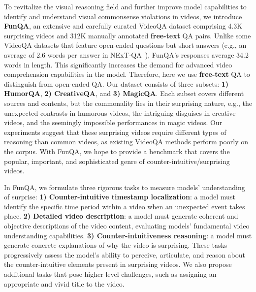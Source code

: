 \noindent To revitalize the visual reasoning field and further improve model capabilities to identify and understand visual commonsense violations in videos, we introduce \textbf{FunQA}, an extensive and carefully curated VideoQA dataset comprising 4.3K surprising videos and 312K manually annotated \textbf{free-text} QA pairs. Unlike some VideoQA datasets that feature open-ended questions but short answers (e.g., an average of 2.6 words per answer in NExT-QA~\cite{xiao2021nextqanext}), FunQA's responses average 34.2 words in length. This significantly increases the demand for advanced video comprehension capabilities in the model. Therefore, here we use \textbf{free-text} QA to distinguish from open-ended QA. Our dataset consists of three subsets: \textbf{1) HumorQA}, \textbf{2) CreativeQA}, and \textbf{3) MagicQA}. Each subset covers different sources and contents, but the commonality lies in their surprising nature, e.g., the unexpected contrasts in humorous videos, the intriguing disguises in creative videos, and the seemingly impossible performances in magic videos. Our experiments suggest that these surprising videos require different types of reasoning than common videos, as existing VideoQA methods perform poorly on the corpus. With FunQA, we hope to provide a benchmark that covers the popular, important, and sophisticated genre of counter-intuitive/surprising videos. 

\noindent In FunQA, we formulate three rigorous tasks to measure models' understanding of surprise:
\textbf{1) Counter-intuitive timestamp localization}: a model must identify the specific time period within a video when an unexpected event takes place.
\textbf{2) Detailed video description}: a model must generate coherent and objective descriptions of the video content, evaluating models' fundamental video understanding capabilities.
\textbf{3) Counter-intuitiveness reasoning}: a model must generate concrete explanations of why the video is surprising. %
These tasks progressively assess the model's ability to perceive, articulate, and reason about the counter-intuitive elements present in surprising videos. We also propose additional tasks that pose higher-level challenges, such as assigning an appropriate and vivid title to the video.


